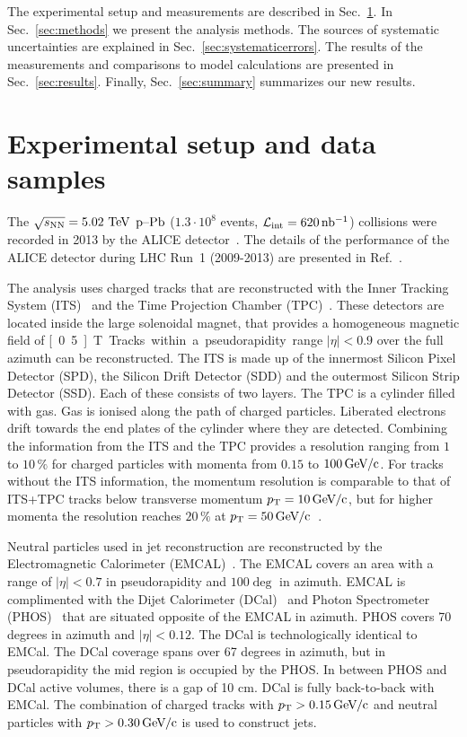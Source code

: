 The experimental setup and measurements are described in Sec.~\ref{sec:experimentaldetails}. In Sec.~\ref{sec:methods} we present the analysis methods. The sources of systematic uncertainties are explained in Sec.~\ref{sec:systematicerrors}. The results of the measurements and comparisons to model calculations are presented in Sec.~\ref{sec:results}.
Finally, Sec.~\ref{sec:summary} summarizes our new results.

\section{Experimental setup and data samples}
\label{sec:experimentaldetails}
The $\sqrt{s_{\mathrm{NN}}} = 5.02~\mathrm{TeV}$ $\mbox{p--Pb}$ ($1.3 \cdot 10^{8}$ events, $\mathcal{L}_{\mathrm{int}} = \unit[620]{nb^{-1}}$) collisions were recorded in 2013 by the ALICE detector~\cite{aliceDetector}. The details of the performance of the ALICE detector during LHC Run~1 (2009-2013) are presented in Ref.~\cite{alicePerformance}.

The analysis uses charged tracks that are reconstructed with the Inner Tracking System (ITS)~\cite{aliceITS} and the Time Projection Chamber (TPC)~\cite{aliceTPC}. These detectors are located inside the large solenoidal magnet, that provides a homogeneous magnetic field of \unit[0.5]{T}. Tracks within a pseudorapidity range $|\eta| < 0.9$ over the full azimuth can be reconstructed. The ITS is made up of the innermost Silicon Pixel Detector (SPD), the Silicon Drift Detector (SDD) and the outermost Silicon Strip Detector (SSD). Each of these consists of two layers. The TPC is a cylinder filled with gas. Gas is ionised along the path of charged particles. Liberated electrons drift towards the end plates of the cylinder where they are detected. Combining the information from the ITS and the TPC provides a resolution ranging from $1$ to $10\,\%$ for charged particles with momenta from $0.15$ to $\unit[100]{\GeVc}$. For tracks without the ITS information, the momentum resolution is comparable to that of ITS+TPC tracks below transverse momentum $\pt{} = \unit[10]{\GeVc}$, but for higher momenta the resolution reaches $20\,\%$ at $\pt{} = \unit[50]{\GeVc}$~\cite{alicePerformance,aliceBackgroundFluctuation}.

Neutral particles used in jet reconstruction are reconstructed by the Electromagnetic Calorimeter (EMCAL)~\cite{Cortese:2008zza}. The EMCAL covers an area with a range of $|\eta| < 0.7$  in pseudorapidity and $ 100 \deg $ in azimuth. EMCAL is complimented with the Dijet Calorimeter (DCal)~\cite{DCAL} and Photon Spectrometer (PHOS)~\cite{PHOS} that are situated opposite of the EMCAL in azimuth. PHOS covers 70 degrees in azimuth and $\left| \eta \right| < 0.12$. The DCal is technologically identical to EMCal. The DCal coverage spans over 67 degrees in azimuth, but in pseudorapidity the mid region is occupied by the PHOS. In between PHOS and DCal active volumes, there is a gap of 10 cm. DCal is fully back-to-back with EMCal.
The combination of charged tracks with  $\pt{} > \unit[0.15]{\GeVc}$ and neutral particles with $\pt{} > \unit[0.30]{\GeVc}$ is used to construct jets.

